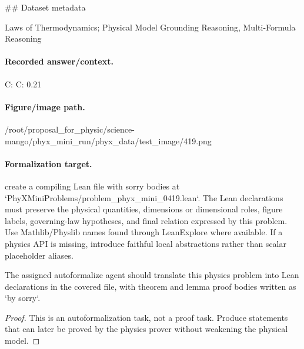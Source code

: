 \#\# Dataset metadata

Laws of Thermodynamics; Physical Model Grounding Reasoning, Multi-Formula Reasoning

\paragraph{Recorded answer/context.}
C: C: 0.21

\paragraph{Figure/image path.}
/root/proposal\_for\_physic/science-mango/phyx\_mini\_run/phyx\_data/test\_image/419.png

\paragraph{Formalization target.}
create a compiling Lean file with sorry bodies at `PhyXMiniProblems/problem\_phyx\_mini\_0419.lean`. The Lean declarations must preserve the physical quantities, dimensions or dimensional roles, figure labels, governing-law hypotheses, and final relation expressed by this problem.
Use Mathlib/Physlib names found through LeanExplore where available. If a physics API is missing, introduce faithful local abstractions rather than scalar placeholder aliases.

\begin{theorem}
\label{thm:physics:phyx_mini_0419:target}
The assigned autoformalize agent should translate this physics problem into Lean declarations in the covered file, with theorem and lemma proof bodies written as `by sorry`.
\end{theorem}
\begin{proof}
This is an autoformalization task, not a proof task. Produce statements that can later be proved by the physics prover without weakening the physical model.
\end{proof}

